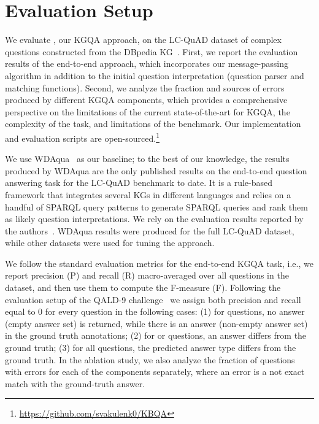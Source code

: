 \section{Evaluation Setup}
\label{sec:evaluation}

We evaluate \OurApproach{}, our KGQA approach, on the LC-QuAD dataset of complex questions constructed from the DBpedia KG~\cite{DBLP:conf/semweb/TrivediMDL17}.
First, we report the evaluation results of the end-to-end approach, which incorporates our message-passing algorithm in addition to the initial question interpretation (question parser and matching functions).
Second, we analyze the fraction and sources of errors produced by different KGQA components, which provides a comprehensive perspective on the limitations of the current state-of-the-art for KGQA, the complexity of the task, and limitations of the benchmark.
Our implementation and evaluation scripts are open-sourced.\footnote{\url{https://github.com/svakulenk0/KBQA}}

We use WDAqua~\cite{DBLP:journals/corr/abs-1803-00832} as our baseline; to the best of our knowledge, the results produced by WDAqua are the only published results on the end-to-end question answering task for the LC-QuAD benchmark to date.
It is a rule-based framework that integrates several KGs in different languages and relies on a handful of SPARQL query patterns to generate SPARQL queries and rank them as likely question interpretations.
We rely on the evaluation results reported by the authors~\cite{DBLP:journals/corr/abs-1803-00832}.
WDAqua results were produced for the full LC-QuAD dataset, while other datasets were used for tuning the approach.

We follow the standard evaluation metrics for the end-to-end KGQA task, i.e., we report precision (P) and recall (R) macro-averaged over all questions in the dataset, and then use them to compute the F-measure (F). 
Following the evaluation setup of the QALD-9 challenge~\cite{DBLP:conf/semweb/UsbeckGN018} we assign both precision and recall equal to 0 for every question in the following cases: (1) for  questions, no answer (empty answer set) is returned, while there is an answer (non-empty answer set) in the ground truth annotations; (2) for  or  questions, an answer differs from the ground truth; (3) for all questions, the predicted answer type differs from the ground truth.
In the ablation study, we also analyze the fraction of questions with errors for each of the components separately, where an error is a not exact match with the ground-truth answer.


